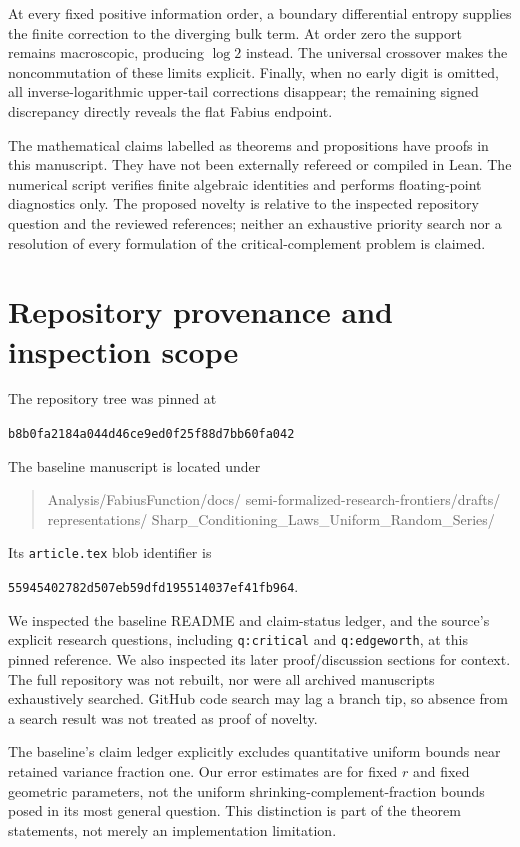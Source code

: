 \documentclass[11pt,oneside]{article}
\numberwithin{equation}{section}
\theoremstyle{plain}
\theoremstyle{definition}
\theoremstyle{remark}
\newcommand{\sha}{\texttt{b8b0fa2184a044d46ce9ed0f25f88d7bb60fa042}}
\begin{document}
At every fixed positive information order, a boundary differential
entropy supplies the finite correction to the diverging bulk term.
At order zero the support remains macroscopic, producing $\log2$
instead. The universal crossover makes the noncommutation of these
limits explicit. Finally, when no early digit is omitted, all
inverse-logarithmic upper-tail corrections disappear; the remaining
signed discrepancy directly reveals the flat Fabius endpoint.

The mathematical claims labelled as theorems and propositions have
proofs in this manuscript. They have not been externally refereed or
compiled in Lean. The numerical script verifies finite algebraic
identities and performs floating-point diagnostics only. The proposed
novelty is relative to the inspected repository question and the
reviewed references; neither an exhaustive priority search nor a
resolution of every formulation of the critical-complement problem
is claimed.

\appendix
\section{Repository provenance and inspection scope}
\label{app:provenance}
The repository tree was pinned at
\begin{center}\small\sha\end{center}
The baseline manuscript is located under
\begin{quote}\small\ttfamily\raggedright
Analysis/FabiusFunction/docs/\allowbreak
semi-formalized-research-frontiers/drafts/\allowbreak
representations/\allowbreak
Sharp\_Conditioning\_Laws\_Uniform\_Random\_Series/
\end{quote}
Its \texttt{article.tex} blob identifier is
\begin{center}\small\texttt{55945402782d507eb59dfd195514037ef41fb964}.
\end{center}
We inspected the baseline README and claim-status ledger, and the
source's explicit research questions, including \texttt{q:critical}
and \texttt{q:edgeworth}, at this pinned reference. We also inspected
its later proof/discussion sections for context. The full repository
was not rebuilt, nor were all archived manuscripts exhaustively
searched. GitHub code search may lag a branch tip, so absence from a
search result was not treated as proof of novelty.

The baseline's claim ledger explicitly excludes quantitative uniform
bounds near retained variance fraction one. Our error estimates are
for fixed $r$ and fixed geometric parameters, not the uniform
shrinking-complement-fraction bounds posed in its most general
question. This distinction is part of the theorem statements, not
merely an implementation limitation.
\end{document}
